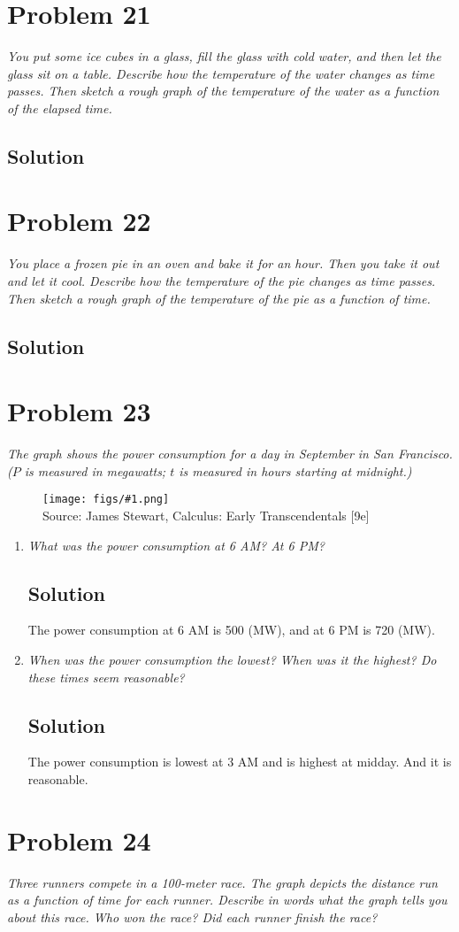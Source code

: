 \documentclass[11pt]{article}
\newcommand{\soln}{\subsection*}
\newcommand{\qn}{\textit}
\newcommand{\imagesource}[1]{{\footnotesize Source: #1}}
\newcommand{\imgqn}[1]{
	\begin{figure}[h]
		\centering
		\texttt{[image: figs/\#1.png]}\\
		\imagesource{James Stewart, Calculus: Early Transcendentals [9e]}
	\end{figure}
}
\begin{document}
\section*{Problem 21}

\qn{You put some ice cubes in a glass, fill the glass with cold water, and then let the glass sit on a table. Describe how the temperature of the water changes as time passes. Then sketch a rough graph of the temperature of the water as a function of the elapsed time.}

\soln{Solution}

\section*{Problem 22}

\qn{You place a frozen pie in an oven and bake it for an hour. Then you take it out and let it cool. Describe how the temperature of the pie changes as time passes. Then sketch a rough graph of the temperature of the pie as a function of time.}

\soln{Solution}

\section*{Problem 23}

\qn{The graph shows the power consumption for a day in September in San Francisco. ($P$ is measured in megawatts; $t$ is measured in hours starting at midnight.)}

\imgqn{1.1.23}

\begin{enumerate}
	\item \qn{What was the power consumption at 6 AM? At 6 PM?}
	\soln{Solution}
	The power consumption at 6 AM is 500 (MW), and at 6 PM is 720 (MW).
	
	\item \qn{When was the power consumption the lowest? When was it the highest? Do these times seem reasonable?}
	\soln{Solution}
	The power consumption is lowest at 3 AM and is highest at midday. And it is reasonable.
\end{enumerate}


\section*{Problem 24}

\qn{Three runners compete in a 100-meter race. The graph depicts the distance run as a function of time for each runner. Describe in words what the graph tells you about this race. Who won the race? Did each runner finish the race?}
\end{document}
